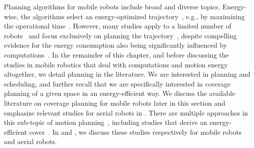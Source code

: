 Planning algorithms for mobile robots include broad and diverse topics. Energy-wise, the algorithms select an energy-optimized trajectory~\citep{mei2004energy}, e.g., by maximizing the operational time~\citep{wahab2015energy}. However, many studies apply to a limited number of robots~\citep{kim2005energy} and focus exclusively on planning the trajectory~\citep{kim2008minimum}, despite compelling evidence for the energy consumption also being significantly influenced by computations~\citep{ondruska2015scheduled,mei2005case}. 
In the remainder of this chapter, and before discussing the studies in mobile robotics that deal with computations and motion energy altogether, we detail planning in the literature. 
We are interested in planning and scheduling, and further recall that we are specifically interested in coverage planning of a given space in an energy-efficient way. We discuss the available literature on coverage planning for mobile robots later in this section and emphasize relevant studies for aerial robots in . There are multiple approaches in this sub-topic of motion planning~\citep{choset2001coverage,cabreira2019survey}, including studies that derive an energy-efficient cover~\citep{wei2018coverage,cabreira2018energy}. In  and , we discuss these studies respectively for mobile robots and aerial robots. 

